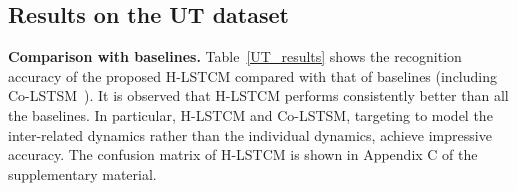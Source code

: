 \documentclass[9pt,journal,letterpaper,twocolumn]{IEEEtran}
\begin{document}
	


	
	
	
	
	
	


	
	
	
	
	\subsection{Results on the UT dataset}
	\vspace{-0mm}
	{\bf Comparison with baselines.} Table~\ref{UT_results} shows the recognition accuracy of the proposed H-LSTCM compared with that of baselines (including Co-LSTSM~\cite{shu2017concurrence}). It is observed that H-LSTCM performs consistently better than all the baselines. In particular, H-LSTCM and Co-LSTSM, targeting to model the inter-related dynamics rather than the individual dynamics, achieve impressive accuracy. The confusion matrix of H-LSTCM is shown in Appendix C of the supplementary material. 
\end{document}
